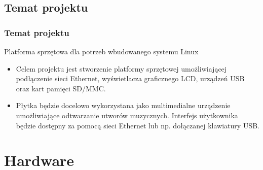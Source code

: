 \documentclass[xcolor=dvipsnames]{beamer}
\newenvironment{ramka}{\begin{frame}}
{
		\end{frame}
}
\begin{document}
	\subsection{Temat projektu}
	\begin{ramka}
		\frametitle{Temat projektu}
		\begin{block}{Platforma sprzętowa dla potrzeb wbudowanego systemu Linux}
			\begin{itemize}
			\item<2->Celem projektu jest stworzenie platformy sprzętowej umożliwiającej podłączenie sieci Ethernet, wyświetlacza graficznego LCD, urządzeń USB oraz kart pamięci SD/MMC.\\
			\item<3->Płytka będzie docelowo wykorzystana jako multimedialne urządzenie umożliwiające odtwarzanie utworów muzycznych. Interfejs użytkownika będzie dostępny za pomocą sieci Ethernet lub np. dołączanej klawiatury USB.
			\end{itemize}
		\end{block}
	\end{ramka} 
	
	\section{Hardware}
	
\end{document}
